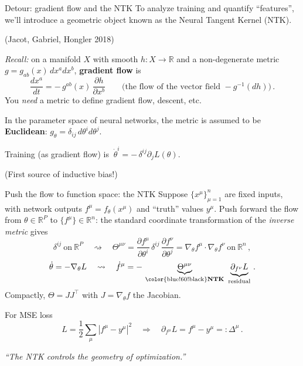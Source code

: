 \documentclass[11pt]{beamer}
\newcommand{\R}{\mathbb{R}}
\newcommand{\pd}{\partial}
\newcommand{\hl}[1]{{\color{blue!60!black}\textbf{#1}}}
\begin{document}
\begin{frame}{Detour: gradient flow and the NTK}
  To analyze training and quantify ``features'', we'll introduce a geometric object known as the Neural Tangent Kernel (NTK). 
  
  (Jacot, Gabriel, Hongler 2018) \pause

\bigskip

  \emph{Recall:} on a manifold $X$ with smooth $h: X\to\R$ and a
  non-degenerate metric $g = g_{ab}(x)\,dx^a dx^b$, \hl{gradient flow}
  is
  \[
    \frac{dx^a}{dt} = -\,g^{ab}(x)\,\frac{\pd h}{\pd x^b}
    \qquad\text{(the flow of the vector field } -g^{-1}(dh)\text{)}\,.
  \]  \pause
  You \emph{need} a metric to define gradient flow, descent, etc.  \pause
  \vspace{2mm}

  In the parameter space of neural networks, the metric is assumed to be
  \hl{Euclidean}: $g_\theta = \delta_{ij}\, d\theta^i d\theta^j$.
  \vspace{1mm}

  Training (as gradient flow) is $\ \dot\theta^i = -\,\delta^{ij}\pd_j L(\theta)$.  \pause
  
  \hspace{1in} (First source of inductive bias!)
\end{frame}

\begin{frame}{Push the flow to function space: the NTK}
  Suppose $\{x^\mu\}_{\mu=1}^n$ are fixed inputs, with network outputs
  $f^\mu = f_\theta(x^\mu)$ and ``truth'' values $y^\mu$.  \pause Push forward
  the flow from $\theta\in\R^P$ to $\{f^\mu\}\in\R^n$: \pause the standard
  coordinate transformation of the \emph{inverse metric} gives
  \[
    \delta^{ij}\ \text{on}\ \R^P
    \quad\rightsquigarrow\quad
    \Theta^{\mu\nu} = \frac{\pd f^\mu}{\pd\theta^i}\,\delta^{ij}\,
    \frac{\pd f^\nu}{\pd\theta^j}
    = \nabla_\theta f^\mu \cdot \nabla_\theta f^\nu\ \text{on}\ \R^n\,,
  \] \pause
  \[
    \dot\theta = -\nabla_\theta L
    \quad\rightsquigarrow\quad
    \dot f^\mu = - \,\underbrace{\Theta^{\mu\nu}}_{\text{\hl{NTK}}}\ \underbrace{\pd_{f^\nu} L}_{\text{residual}}\,.
  \] \pause
  Compactly, $\Theta = J J^{\!\top}$ with $J = \nabla_\theta f$ the
  Jacobian. \pause
  
  \smallskip
   For MSE loss
   \[ L = \frac12\sum_\mu |f^\mu - y^\mu|^2\quad\Rightarrow\quad
  \pd_{f^\mu}L = f^\mu - y^\mu =: \Delta^\mu \,. \]  \pause

  \emph{``The NTK controls the geometry of optimization.''}
\end{frame}
\end{document}
